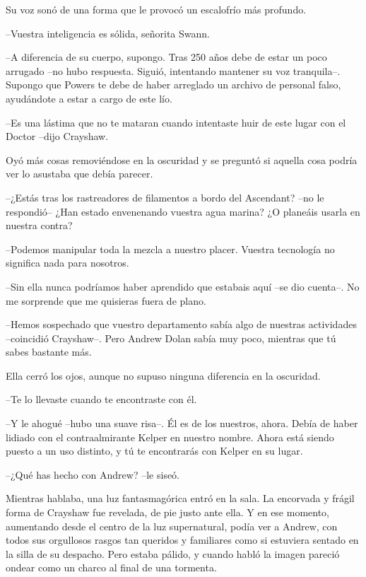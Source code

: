 {Su voz sonó de una forma que le provocó un escalofrío más profundo.}

{--Vuestra inteligencia es sólida, señorita Swann.}

{--A diferencia de su cuerpo, supongo. Tras 250 años debe de estar un
 poco arrugado --no hubo respuesta. Siguió, intentando mantener su voz
 tranquila--. Supongo que Powers te debe de haber arreglado un archivo de
personal falso, ayudándote a estar a cargo de este lío.}

{--Es una lástima que no te mataran cuando intentaste huir de este lugar
con el Doctor --dijo Crayshaw.}

{Oyó más cosas removiéndose en la oscuridad y se preguntó si aquella
cosa podría ver lo asustaba que debía parecer.}

{--¿Estás tras los rastreadores de filamentos a bordo del Ascendant?
 --no le respondió-- ¿Han estado envenenando vuestra agua marina? ¿O
planeáis usarla en nuestra contra?}

{--Podemos manipular toda la mezcla a nuestro placer. Vuestra tecnología
no significa nada para nosotros.}

{--Sin ella nunca podríamos haber aprendido que estabais aquí --se dio
cuenta--. No me sorprende que me quisieras fuera de plano.}

{--Hemos sospechado que vuestro departamento sabía algo de nuestras
 actividades --coincidió Crayshaw--. Pero Andrew Dolan sabía muy poco,
mientras que tú sabes bastante más.}

{Ella cerró los ojos, aunque no supuso ninguna diferencia en la
oscuridad.}

{--Te lo llevaste cuando te encontraste con él.}

{--Y le ahogué --hubo una suave risa--. Él es de los nuestros, ahora.
 Debía de haber lidiado con el contraalmirante Kelper en nuestro nombre.
 Ahora está siendo puesto a un uso distinto, y tú te encontrarás con
Kelper en su lugar.}

{--¿Qué has hecho con Andrew? --le siseó.}

{Mientras hablaba, una luz fantasmagórica entró en la sala. La encorvada
 y frágil forma de Crayshaw fue revelada, de pie justo ante ella. Y en
 ese momento, aumentando desde el centro de la luz supernatural, podía
 ver a Andrew, con todos sus orgullosos rasgos tan queridos y familiares
 como si estuviera sentado en la silla de su despacho. Pero estaba
 pálido, y cuando habló la imagen pareció ondear como un charco al final
de una tormenta.}

